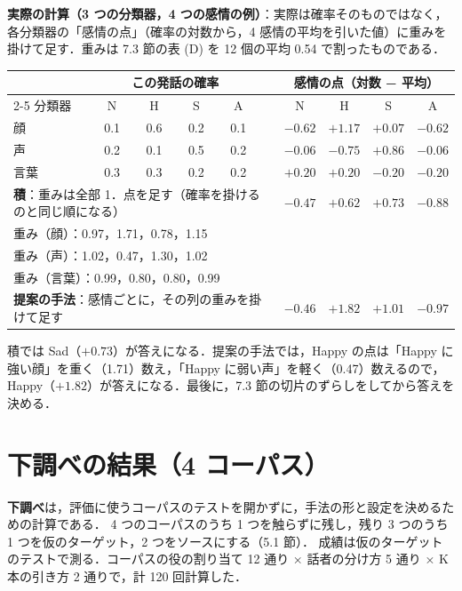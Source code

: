 \documentclass[a4paper,11pt]{ltjsarticle}
\begin{document}
\noindent\textbf{実際の計算（3 つの分類器，4 つの感情の例）}：実際は確率そのものではなく，各分類器の「感情の点」（確率の対数から，4 感情の平均を引いた値）に重みを掛けて足す．重みは 7.3 節の表 (D) を 12 個の平均 0.54 で割ったものである．
\begin{center}
\footnotesize
\setlength{\tabcolsep}{5pt}
\begin{tabular}{l cccc c cccc}
\toprule
 & \multicolumn{4}{c}{この発話の確率} & & \multicolumn{4}{c}{感情の点（対数 − 平均）} \\
\cmidrule{2-5}\cmidrule{7-10}
分類器 & N & H & S & A & & N & H & S & A \\
\midrule
顔 & 0.1 & 0.6 & 0.2 & 0.1 & & $-0.62$ & $+1.17$ & $+0.07$ & $-0.62$ \\
声 & 0.2 & 0.1 & 0.5 & 0.2 & & $-0.06$ & $-0.75$ & $+0.86$ & $-0.06$ \\
言葉 & 0.3 & 0.3 & 0.2 & 0.2 & & $+0.20$ & $+0.20$ & $-0.20$ & $-0.20$ \\
\midrule
\multicolumn{6}{l}{\textbf{積}：重みは全部 1．点を足す（確率を掛けるのと同じ順になる）} & $-0.47$ & $+0.62$ & $\mathbf{+0.73}$ & $-0.88$ \\
\midrule
\multicolumn{6}{l}{重み（顔）：0.97，1.71，0.78，1.15} & & & & \\
\multicolumn{6}{l}{重み（声）：1.02，0.47，1.30，1.02} & & & & \\
\multicolumn{6}{l}{重み（言葉）：0.99，0.80，0.80，0.99} & & & & \\
\multicolumn{6}{l}{\textbf{提案の手法}：感情ごとに，その列の重みを掛けて足す} & $-0.46$ & $\mathbf{+1.82}$ & $+1.01$ & $-0.97$ \\
\bottomrule
\end{tabular}
\end{center}
積では Sad（$+0.73$）が答えになる．提案の手法では，Happy の点は「Happy に強い顔」を重く（1.71）数え，「Happy に弱い声」を軽く（0.47）数えるので，Happy（$+1.82$）が答えになる．最後に，7.3 節の切片のずらしをしてから答えを決める．


\section{下調べの結果（4 コーパス）}

\textbf{下調べ}は，評価に使うコーパスのテストを開かずに，手法の形と設定を決めるための計算である．
4 つのコーパスのうち 1 つを触らずに残し，残り 3 つのうち 1 つを仮のターゲット，2 つをソースにする（5.1 節）．
成績は仮のターゲットのテストで測る．コーパスの役の割り当て 12 通り × 話者の分け方 5 通り × K 本の引き方 2 通りで，計 120 回計算した．
\end{document}
